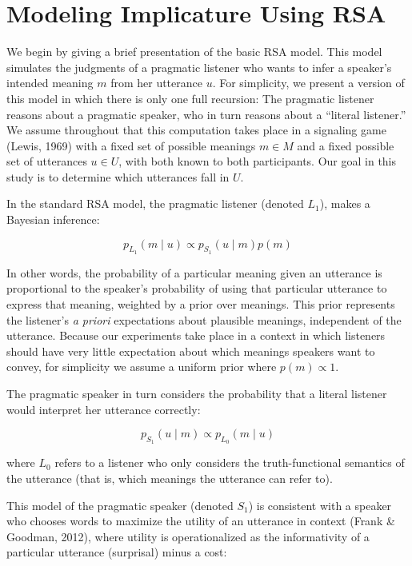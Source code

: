 \documentclass[10pt, letterpaper]{article}
\begin{document}
\section{Modeling Implicature Using
RSA}\label{modeling-implicature-using-rsa}

We begin by giving a brief presentation of the basic RSA model. This
model simulates the judgments of a pragmatic listener who wants to infer
a speaker's intended meaning \(m\) from her utterance \(u\). For
simplicity, we present a version of this model in which there is only
one full recursion: The pragmatic listener reasons about a pragmatic
speaker, who in turn reasons about a ``literal listener.'' We assume
throughout that this computation takes place in a signaling game (Lewis,
1969) with a fixed set of possible meanings \(m \in M\) and a fixed
possible set of utterances \(u \in U\), with both known to both
participants. Our goal in this study is to determine which utterances
fall in \(U\).

In the standard RSA model, the pragmatic listener (denoted \(L_1\)),
makes a Bayesian inference:

\[p_{L_1}(m \mid u) \propto p_{S_1} (u \mid m) p(m) \tag{1}\]

\noindent In other words, the probability of a particular meaning given
an utterance is proportional to the speaker's probability of using that
particular utterance to express that meaning, weighted by a prior over
meanings. This prior represents the listener's \emph{a priori}
expectations about plausible meanings, independent of the utterance.
Because our experiments take place in a context in which listeners
should have very little expectation about which meanings speakers want
to convey, for simplicity we assume a uniform prior where
\(p(m) \propto 1\).

The pragmatic speaker in turn considers the probability that a literal
listener would interpret her utterance correctly:

\[p_{S_1}(u \mid m) \propto p_{L_0} (m \mid u) \tag{2}\]

\noindent where \(L_0\) refers to a listener who only considers the
truth-functional semantics of the utterance (that is, which meanings the
utterance can refer to).

This model of the pragmatic speaker (denoted \(S_1\)) is consistent with
a speaker who chooses words to maximize the utility of an utterance in
context (Frank \& Goodman, 2012), where utility is operationalized as
the informativity of a particular utterance (surprisal) minus a cost:
\end{document}

